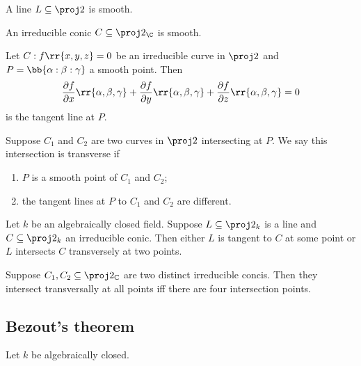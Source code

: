 \documentclass{article}
\begin{document}
\begin{lemma}
  A line $L\subseteq\proj 2$ is smooth.
\end{lemma}

\begin{lemma}
  An irreducible conic $C\subseteq\proj 2_{\C}$ is smooth.
\end{lemma}

\begin{definition}
  Let $C:f\rr{x,y,z}=0$ be an irreducible curve in $\proj 2$ and $P=\bb{\alpha:\beta:\gamma}$
  a smooth point. Then
  \begin{align*}
    \frac{\partial f}{\partial x}\rr{\alpha,\beta,\gamma}
    +\frac{\partial f}{\partial y}\rr{\alpha,\beta,\gamma}
    +\frac{\partial f}{\partial z}\rr{\alpha,\beta,\gamma}
    =0
  \end{align*}
  is the tangent line at $P$.
\end{definition}

\begin{definition}
  Suppose $C_1$ and $C_2$ are two curves in $\proj 2$ intersecting at $P$. We say this
  intersection is transverse if
  \begin{enumerate}
    \item $P$ is a smooth point of $C_1$ and $C_2$;
    \item the tangent lines at $P$ to $C_1$ and $C_2$ are different.
  \end{enumerate}
\end{definition}

\begin{proposition}
  Let $k$ be an algebraically closed field. Suppose $L\subseteq\proj 2_k$ is a line and
  $C\subseteq\proj 2_k$ an irreducible conic. Then either $L$ is tangent to $C$ at some point
  or $L$ intersects $C$ transversely at two points.
\end{proposition}

\begin{proposition}
  Suppose $C_1,C_2\subseteq\proj 2_{\mathbb C}$ are two distinct irreducible concis. Then they
  intersect transversally at all points iff there are four intersection points.
\end{proposition}

\subsection{Bezout's theorem}\label{sec:bezouts_theorem}

Let $k$ be algebraically closed.
\end{document}

